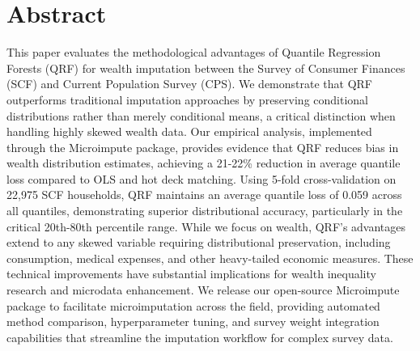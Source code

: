 \section*{Abstract}

This paper evaluates the methodological advantages of Quantile Regression Forests (QRF) for wealth imputation between the Survey of Consumer Finances (SCF) and Current Population Survey (CPS). We demonstrate that QRF outperforms traditional imputation approaches by preserving conditional distributions rather than merely conditional means, a critical distinction when handling highly skewed wealth data. Our empirical analysis, implemented through the Microimpute package, provides evidence that QRF reduces bias in wealth distribution estimates, achieving a 21-22\% reduction in average quantile loss compared to OLS and hot deck matching. Using 5-fold cross-validation on 22,975 SCF households, QRF maintains an average quantile loss of 0.059 across all quantiles, demonstrating superior distributional accuracy, particularly in the critical 20th-80th percentile range. While we focus on wealth, QRF's advantages extend to any skewed variable requiring distributional preservation, including consumption, medical expenses, and other heavy-tailed economic measures. These technical improvements have substantial implications for wealth inequality research and microdata enhancement. We release our open-source Microimpute package to facilitate microimputation across the field, providing automated method comparison, hyperparameter tuning, and survey weight integration capabilities that streamline the imputation workflow for complex survey data.